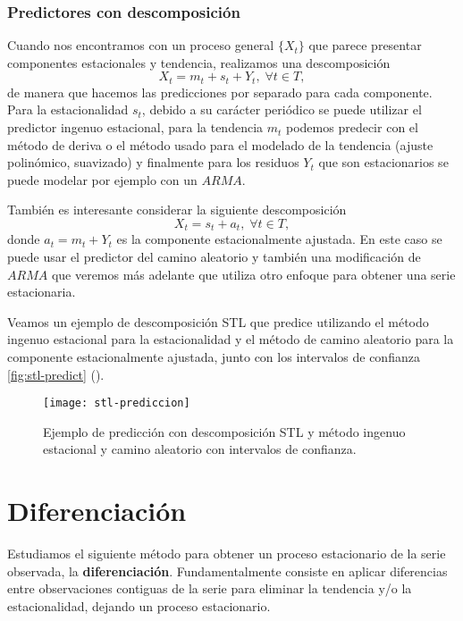 \subsubsection{Predictores con descomposición}

Cuando nos encontramos con un proceso general $\{X_t\}$ que parece presentar componentes estacionales y tendencia, realizamos una descomposición
\begin{equation*}
  X_t = m_t + s_t + Y_t, \; \forall t \in T,
  \label{eq:pred-decomp}
\end{equation*}
de manera que hacemos las predicciones por separado para cada componente. Para la estacionalidad $s_t$, debido a su carácter periódico se puede utilizar el predictor ingenuo estacional, para la tendencia $m_t$ podemos predecir con el método de deriva o el método usado para el modelado de la tendencia (ajuste polinómico, suavizado) y finalmente para los residuos $Y_t$ que son estacionarios se puede modelar por ejemplo con un $ARMA$.

También es interesante considerar la siguiente descomposición
\begin{equation}
  X_t = s_t + a_t, \; \forall t \in T,
  \label{eq:decomp-nueva}
\end{equation}
donde $a_t = m_t + Y_t$ es la componente estacionalmente ajustada. En este caso se puede usar el predictor del camino aleatorio y también una modificación de $ARMA$ que veremos más adelante que utiliza otro enfoque para obtener una serie estacionaria.

Veamos un ejemplo de descomposición STL que predice utilizando el método ingenuo estacional para la estacionalidad y el método de camino aleatorio para la componente estacionalmente ajustada, junto con los intervalos de confianza \autoref{fig:stl-predict} (\cite{hyndman2018forecasting}).

\begin{figure}[htpb]
  \centering
  \texttt{[image: stl-prediccion]}
  \caption{Ejemplo de predicción con descomposición STL y método ingenuo estacional y camino aleatorio con intervalos de confianza.}
  \label{fig:stl-predict}
\end{figure}

\section{Diferenciación}

Estudiamos el siguiente método para obtener un proceso estacionario de la serie observada, la \textbf{diferenciación}. Fundamentalmente consiste en aplicar diferencias entre observaciones contiguas de la serie para eliminar la tendencia y/o la estacionalidad, dejando un proceso estacionario.

